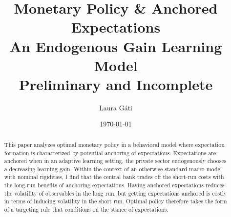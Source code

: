 \documentclass[11pt]{article}
\renewcommand{\[}{\begin{equation}}
\renewcommand{\]}{\end{equation}}
\begin{document}
\title{Monetary Policy \& Anchored Expectations \\
An Endogenous Gain Learning Model \\
\vspace{0.8cm}
\small{Preliminary and Incomplete}}
\author{Laura G\'ati} 
\date{\today}
\maketitle


\begin{abstract}
This paper analyzes optimal monetary policy in a behavioral model where expectation formation is characterized by potential anchoring of expectations. Expectations are anchored when in an adaptive learning setting, the private sector endogenously chooses a decreasing learning gain. Within the context of an otherwise standard macro model with nominal rigidities, I find that the central bank trades off the short-run costs with the long-run benefits of anchoring expectations. Having anchored expectations reduces the volatility of observables in the long run, but getting expectations anchored is costly in terms of inducing volatility in the short run. Optimal policy therefore takes the form of a targeting rule that conditions on the stance of expectations.   
\end{abstract}




\newpage
\end{document}
